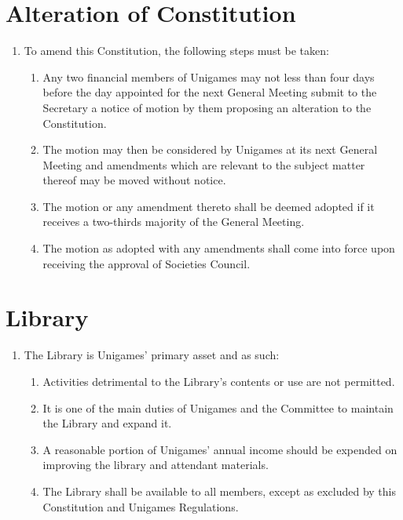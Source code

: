 \documentclass[a4paper]{article}
\begin{document}
\section{Alteration of Constitution} \label{sec:alteration}
\begin{enumerate}
    \item To amend this Constitution, the following steps must be taken:
          \begin{enumerate}
              \item Any two financial members of Unigames may not less than four days before the day appointed for the next General Meeting submit to the Secretary a notice of motion by them proposing an alteration to the Constitution.
              \item The motion may then be considered by Unigames at its next General Meeting and amendments which are relevant to the subject matter thereof may be moved without notice.
              \item The motion or any amendment thereto shall be deemed adopted if it receives a two-thirds majority of the General Meeting.
              \item The motion as adopted with any amendments shall come into force upon receiving the approval of Societies Council.
          \end{enumerate}
\end{enumerate}


\section{Library} \label{sec:library}
\begin{enumerate}
    \item The Library is Unigames' primary asset and as such:
          \begin{enumerate}
              \item Activities detrimental to the Library's contents or use are not permitted.
              \item It is one of the main duties of Unigames and the Committee to maintain the Library and expand it.
              \item A reasonable portion of Unigames' annual income should be expended on improving the library and attendant materials.
              \item The Library shall be available to all members, except as excluded by this Constitution and Unigames Regulations.
          \end{enumerate}
\end{enumerate}
\end{document}
